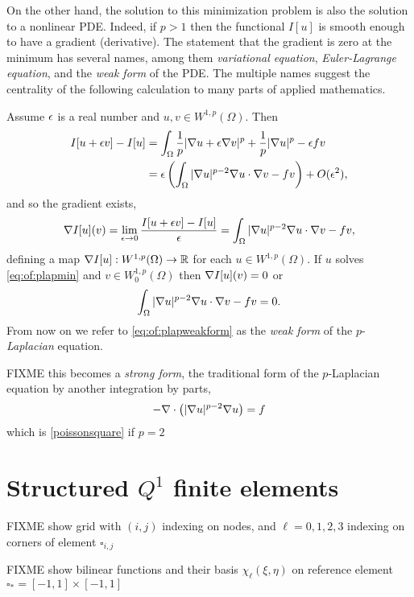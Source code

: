 On the other hand, the solution to this minimization problem is also the solution to a nonlinear PDE.  Indeed, if $p>1$ then the functional $I[u]$ is smooth enough to have a gradient (derivative).  The statement that the gradient is zero at the minimum has several names, among them \emph{variational equation}, \emph{Euler-Lagrange equation}, and the \emph{weak form} of the PDE.  The multiple names suggest the centrality of the following calculation to many parts of applied mathematics.

Assume $\epsilon$ is a real number and $u,v \in W^{1,p}(\Omega)$.  Then
\begin{align*}
I[u+\epsilon v] - I[u] &= \int_\Omega \frac{1}{p} |\nabla u + \epsilon \nabla v|^p + \frac{1}{p} |\nabla u|^p - \epsilon f v \\
   &= \epsilon \left(\int_\Omega |\nabla u|^{p-2} \nabla u \cdot \nabla v - f v\right) + O(\epsilon^2),
\end{align*}
and so the gradient exists,
\begin{equation}
\nabla I[u](v) = \lim_{\epsilon\to 0} \frac{I[u+\epsilon v] - I[u]}{\epsilon} = \int_\Omega |\nabla u|^{p-2} \nabla u \cdot \nabla v - f v, \label{eq:of:plapfunctionalderivative}
\end{equation}
defining a map $\nabla I[u] : W^{1,p}(\Omega) \to \mathbb{R}$ for each $u \in W^{1,p}(\Omega)$.  If $u$ solves \eqref{eq:of:plapmin} and $v\in W_0^{1,p}(\Omega)$ then $\nabla I[u](v)=0$ or
\begin{equation}
\int_\Omega |\nabla u|^{p-2} \nabla u \cdot \nabla v - f v = 0. \label{eq:of:plapweakform}
\end{equation}
From now on we refer to \eqref{eq:of:plapweakform} as the \emph{weak form} of the $p$-\emph{Laplacian} equation.

FIXME this becomes a \emph{strong form}, the traditional form of the $p$-Laplacian equation by another integration by parts,
\begin{equation}
- \nabla\cdot\left(|\nabla u|^{p-2} \nabla u\right) = f
\label{eq:of:plapstrongform}
\end{equation}
which is \eqref{poissonsquare} if $p=2$


\section{Structured $Q^1$ finite elements}

FIXME show grid with $(i,j)$ indexing on nodes, and $\ell=0,1,2,3$ indexing on corners of element $\square_{i,j}$

FIXME show bilinear functions and their basis $\chi_\ell(\xi,\eta)$ on reference element $\square_\ast = [-1,1]\times[-1,1]$

